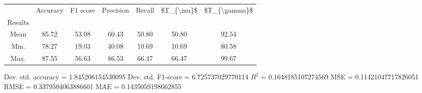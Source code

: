 \begin{tabular}{|c|c|c|c|c|c|c|}
\toprule
{} &  Accuracy &  F1 score &  Precision &  Recall &  \$T\_\{\textbackslash mu\}\$ &  \$T\_\{\textbackslash gamma\}\$ \\
Results &           &           &            &         &            &               \\
\hline
Mean    &     85.72 &     53.08 &      60.43 &   50.80 &      50.80 &         92.54 \\
Min.    &     78.27 &     19.03 &      40.08 &   10.69 &      10.69 &         80.58 \\
Max.    &     87.55 &     56.63 &      86.53 &   66.47 &      66.47 &         99.67 \\
\bottomrule
\end{tabular}

 Dev. std. accuracy = 1.845206154530095
 Dev. std. F1-score = 6.725737029770114
 $R^2$ = 0.1648185107274569
 MSE = 0.11421047717826051
 RMSE = 0.3379504063886601
 MAE = 0.1435059198662855